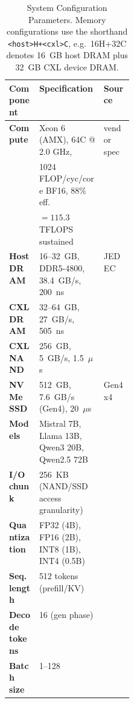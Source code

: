 \documentclass[10pt,conference,letterpaper]{IEEEtran}
\begin{document}
\begin{table}[t]
\scriptsize
\centering
\caption{System Configuration Parameters. Memory configurations use the shorthand \texttt{<host>H+<cxl>C}, e.g.\ 16H+32C denotes 16~GB host DRAM plus 32~GB CXL device DRAM.}
\label{tab:system_params}
\begin{tabular}{llp{0.24\linewidth}}
\hline
\textbf{Component} & \textbf{Specification} & \textbf{Source} \\
\hline
\textbf{Compute} & Xeon 6 (AMX), 64C @ 2.0 GHz, & vendor spec \\
                 & 1024 FLOP/cyc/core BF16, 88\% eff. & \\
                 & $=115.3$ TFLOPS sustained & \\
\textbf{Host DRAM} & 16--32~GB, DDR5-4800, 38.4~GB/s, 200~ns & JEDEC \\
\textbf{CXL DRAM} & 32--64~GB, 27~GB/s, 505~ns & \cite{soltaniyeh2025revisiting} \\
\textbf{CXL NAND} & 256~GB, 5~GB/s, 1.5~$\mu$s & \cite{soltaniyeh2025revisiting} \\
\textbf{NVMe SSD} & 512~GB, 7.6~GB/s (Gen4), 20~$\mu$s & Gen4 x4 \\
\hline
\textbf{Models} & Mistral 7B, Llama 13B, Qwen3 20B, Qwen2.5 72B & \\
\textbf{I/O chunk} & 256~KB (NAND/SSD access granularity) & \\
\textbf{Quantization} & FP32 (4B), FP16 (2B), INT8 (1B), INT4 (0.5B) & \\
\textbf{Seq. length} & 512 tokens (prefill/KV) & \\
\textbf{Decode tokens} & 16 (gen phase) & \\
\textbf{Batch size} & 1--128 & \\
\bottomrule
\end{tabular}
\vspace{1mm}
\end{table}
\end{document}
